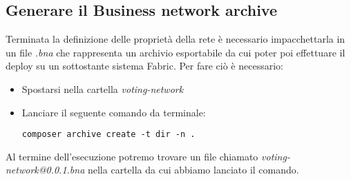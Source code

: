 	\subsection{Generare il Business network archive}
		Terminata la definizione delle proprietà della rete è necessario impacchettarla in un file \emph{.bna} che rappresenta un archivio esportabile da cui poter poi effettuare il deploy su un sottostante sistema Fabric.
		Per fare ciò è necessario:
		\begin{itemize}
			\item Spostarsi nella cartella \emph{voting-network}
			\item Lanciare il seguente comando da terminale:
				\begin{lstlisting}
composer archive create -t dir -n .
				\end{lstlisting}
		\end{itemize}
		Al termine dell'esecuzione potremo trovare un file chiamato \emph{voting-network@0.0.1.bna} nella cartella da cui abbiamo lanciato il comando.